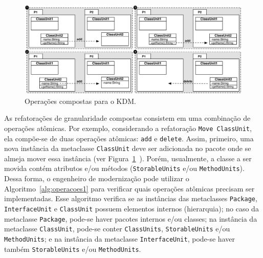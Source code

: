 \begin{figure}[h]
	\centering
	\caption{Operações compostas para o KDM.}
	\label{fig:operacoes_compostas_figuras}
	\includegraphics[scale=0.63]{images/moveNested}
	\fautor
\end{figure}

\begin{algoritmo}[h]
     \SetAlgoLined
     \caption{Algoritmo para criar refatorações compostas.}
     \label{alg:operacoes1}
   \end{algoritmo}

As refatorações de granularidade compostas consistem em uma combinação de operações atômicas. Por exemplo, considerando a refatoração \texttt{Move ClassUnit}, ela compõe-se de duas operações atômicas: \texttt{add} e \texttt{delete}. Assim, primeiro, uma nova instância da metaclasse \texttt{ClassUnit} deve ser adicionada no pacote onde se almeja mover essa instância (ver Figura~\ref{fig:operacoes_compostas_figuras}~). Porém, usualmente, a classe a ser movida contém atributos e/ou métodos (\texttt{StorableUnits} e/ou \texttt{MethodUnits}). Dessa forma, o engenheiro de modernização pode utilizar o Algoritmo~\ref{alg:operacoes1} para verificar quais operações atômicas precisam ser implementadas. Esse algoritmo verifica se as instâncias das metaclasses \texttt{Package}, \texttt{InterfaceUnit} e \texttt{ClassUnit} possuem elementos internos (hierarquia); no caso da metaclasse \texttt{Package}, pode-se haver pacotes internos e/ou classes; na instância da metaclasse \texttt{ClassUnit}, pode-se conter \texttt{ClassUnits}, \texttt{StorableUnits} e/ou \texttt{MethodUnits}; e na instância da metaclasse \texttt{InterfaceUnit}, pode-se haver também \texttt{StorableUnits} e/ou \texttt{MethodUnits}. 

